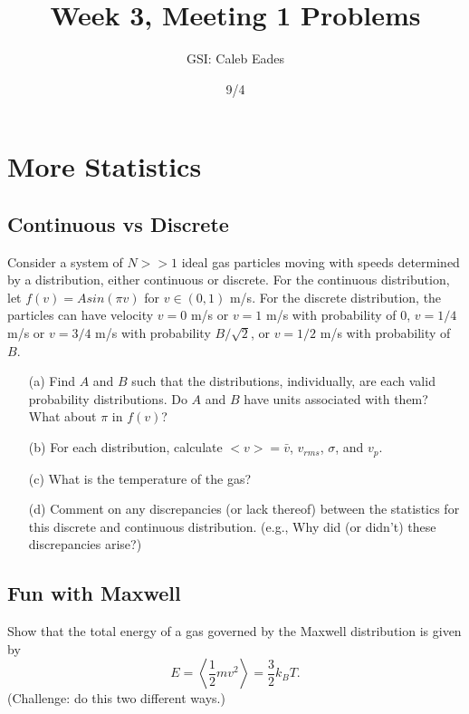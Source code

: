 \documentclass{article}
\begin{document}
	
\title{Week 3, Meeting 1 Problems}
\author{GSI: Caleb Eades}
\date{9/4}
\maketitle

\section{More Statistics}

\subsection{Continuous vs Discrete}

Consider a system of $N>>1$ ideal gas particles moving with speeds determined by a distribution, either continuous or discrete. For the continuous distribution, let $f(v) = Asin(\pi v)$ for $v\in(0,1)$ m/s. For the discrete distribution, the particles can have velocity $v=0$ m/s or $v=1$ m/s with probability of $0$, $v=1/4$ m/s or $v=3/4$ m/s with probability $B/\sqrt{2}$, or $v=1/2$ m/s with probability of $B$.

\begin{itemize}
	\item[(a)] Find $A$ and $B$ such that the distributions, individually, are each valid probability distributions. Do $A$ and $B$ have units associated with them? What about $\pi$ in $f(v)$?
	\item[(b)] For each distribution, calculate $<v> = \bar{v}$, $v_{rms}$, $\sigma$, and $v_p$.
	\item[(c)] What is the temperature of the gas?
	\item[(d)] Comment on any discrepancies (or lack thereof) between the statistics for this discrete and continuous distribution. (e.g., Why did (or didn't) these discrepancies arise?)
\end{itemize}

\subsection{Fun with Maxwell}

Show that the total energy of a gas governed by the Maxwell distribution is given by
\begin{equation}
E = \left<\frac{1}{2}mv^2\right>=\frac{3}{2}k_BT.
\end{equation}
(Challenge: do this two different ways.)

\newpage
\end{document}
